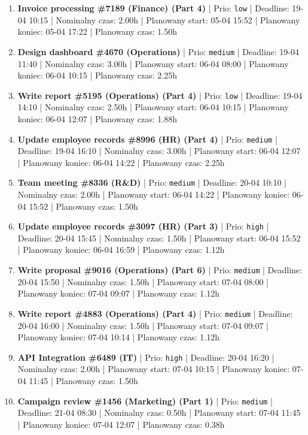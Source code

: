 {\begin{enumerate}
  \item [\textbf{14678}] \textbf{Invoice processing \#7189 (Finance) (Part 4)} | Prio: \texttt{low} | Deadline: 19-04 10:15 | Nominalny czas: 2.00h | Planowany start: 05-04 15:52 | Planowany koniec: 05-04 17:22 | Planowany czas: 1.50h
  \item [\textbf{14676}] \textbf{Design dashboard \#4670 (Operations)} | Prio: \texttt{medium} | Deadline: 19-04 11:40 | Nominalny czas: 3.00h | Planowany start: 06-04 08:00 | Planowany koniec: 06-04 10:15 | Planowany czas: 2.25h
  \item [\textbf{14687}] \textbf{Write report \#5195 (Operations) (Part 4)} | Prio: \texttt{low} | Deadline: 19-04 14:10 | Nominalny czas: 2.50h | Planowany start: 06-04 10:15 | Planowany koniec: 06-04 12:07 | Planowany czas: 1.88h
  \item [\textbf{14655}] \textbf{Update employee records \#8996 (HR) (Part 4)} | Prio: \texttt{medium} | Deadline: 19-04 16:10 | Nominalny czas: 3.00h | Planowany start: 06-04 12:07 | Planowany koniec: 06-04 14:22 | Planowany czas: 2.25h
  \item [\textbf{14649}] \textbf{Team meeting \#8336 (R\&D)} | Prio: \texttt{medium} | Deadline: 20-04 10:10 | Nominalny czas: 2.00h | Planowany start: 06-04 14:22 | Planowany koniec: 06-04 15:52 | Planowany czas: 1.50h
  \item [\textbf{14621}] \textbf{Update employee records \#3097 (HR) (Part 3)} | Prio: \texttt{high} | Deadline: 20-04 15:45 | Nominalny czas: 1.50h | Planowany start: 06-04 15:52 | Planowany koniec: 06-04 16:59 | Planowany czas: 1.12h
  \item [\textbf{14662}] \textbf{Write proposal \#9016 (Operations) (Part 6)} | Prio: \texttt{medium} | Deadline: 20-04 15:50 | Nominalny czas: 1.50h | Planowany start: 07-04 08:00 | Planowany koniec: 07-04 09:07 | Planowany czas: 1.12h
  \item [\textbf{14651}] \textbf{Write report \#4883 (Operations) (Part 4)} | Prio: \texttt{medium} | Deadline: 20-04 16:00 | Nominalny czas: 1.50h | Planowany start: 07-04 09:07 | Planowany koniec: 07-04 10:14 | Planowany czas: 1.12h
  \item [\textbf{14620}] \textbf{API Integration \#6489 (IT)} | Prio: \texttt{high} | Deadline: 20-04 16:20 | Nominalny czas: 2.00h | Planowany start: 07-04 10:15 | Planowany koniec: 07-04 11:45 | Planowany czas: 1.50h
  \item [\textbf{14653}] \textbf{Campaign review \#1456 (Marketing) (Part 1)} | Prio: \texttt{medium} | Deadline: 21-04 08:30 | Nominalny czas: 0.50h | Planowany start: 07-04 11:45 | Planowany koniec: 07-04 12:07 | Planowany czas: 0.38h

\end{enumerate}}
